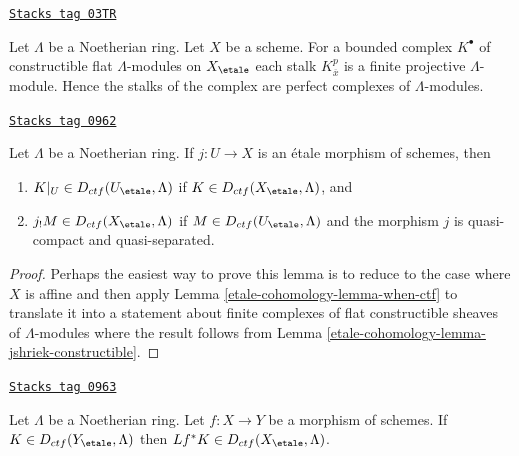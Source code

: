 \begin{remark}
\label{etale-cohomology-remark-projective-each-degree}
\href{https://stacks.math.columbia.edu/tag/03TR}{\texttt{Stacks tag 03TR}}

Let $\Lambda$ be a Noetherian ring. Let $X$ be a scheme.
For a bounded complex $K^\bullet$ of constructible flat $\Lambda$-modules
on $X_\etale$
each stalk $K^p_{\overline{x}}$ is a finite projective $\Lambda$-module.
Hence the stalks of the complex are perfect complexes of $\Lambda$-modules.
\end{remark}

\begin{lemma}
\label{etale-cohomology-lemma-restrict-and-shriek-from-etale-ctf}
\href{https://stacks.math.columbia.edu/tag/0962}{\texttt{Stacks tag 0962}}

Let $\Lambda$ be a Noetherian ring.
If $j : U \to X$ is an \'etale morphism of schemes, then
\begin{enumerate}
\item $K|_U \in D_{ctf}(U_\etale, \Lambda)$ if
$K \in D_{ctf}(X_\etale, \Lambda)$, and
\item $j_!M \in D_{ctf}(X_\etale, \Lambda)$ if
$M \in D_{ctf}(U_\etale, \Lambda)$ and
the morphism $j$ is quasi-compact and quasi-separated.
\end{enumerate}
\end{lemma}

\begin{proof}
Perhaps the easiest way to prove this lemma is to reduce to the
case where $X$ is affine and then apply Lemma \ref{etale-cohomology-lemma-when-ctf}
to translate it into a statement about finite complexes
of flat constructible sheaves of $\Lambda$-modules
where the result follows from Lemma \ref{etale-cohomology-lemma-jshriek-constructible}.
\end{proof}

\begin{lemma}
\label{etale-cohomology-lemma-pullback-ctf}
\href{https://stacks.math.columbia.edu/tag/0963}{\texttt{Stacks tag 0963}}

Let $\Lambda$ be a Noetherian ring. Let $f : X \to Y$ be a morphism of schemes.
If $K \in D_{ctf}(Y_\etale, \Lambda)$ then
$Lf^*K \in D_{ctf}(X_\etale, \Lambda)$.
\end{lemma}

